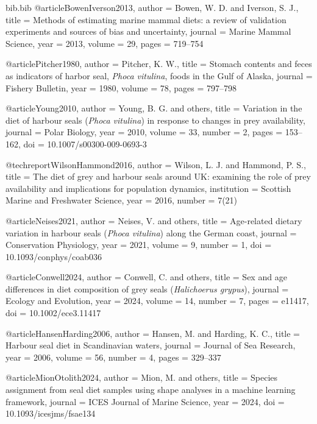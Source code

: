 \begin{filecontents*}{bib.bib}
@article{BowenIverson2013,
  author  = {Bowen, W. D. and Iverson, S. J.},
  title   = {Methods of estimating marine mammal diets: a review of validation experiments and sources of bias and uncertainty},
  journal = {Marine Mammal Science},
  year    = {2013},
  volume  = {29},
  pages   = {719--754}
}

@article{Pitcher1980,
  author  = {Pitcher, K. W.},
  title   = {Stomach contents and feces as indicators of harbor seal, \textit{Phoca vitulina}, foods in the {G}ulf of {A}laska},
  journal = {Fishery Bulletin},
  year    = {1980},
  volume  = {78},
  pages   = {797--798}
}

@article{Young2010,
  author  = {Young, B. G. and others},
  title   = {Variation in the diet of harbour seals (\textit{Phoca vitulina}) in response to changes in prey availability},
  journal = {Polar Biology},
  year    = {2010},
  volume  = {33},
  number  = {2},
  pages   = {153--162},
  doi     = {10.1007/s00300-009-0693-3}
}

@techreport{WilsonHammond2016,
  author      = {Wilson, L. J. and Hammond, P. S.},
  title       = {The diet of grey and harbour seals around {UK}: examining the role of prey availability and implications for population dynamics},
  institution = {Scottish Marine and Freshwater Science},
  year        = {2016},
  number      = {7(21)}
}

@article{Neises2021,
  author  = {Neises, V. and others},
  title   = {Age-related dietary variation in harbour seals (\textit{Phoca vitulina}) along the {G}erman coast},
  journal = {Conservation Physiology},
  year    = {2021},
  volume  = {9},
  number  = {1},
  doi     = {10.1093/conphys/coab036}
}

@article{Conwell2024,
  author  = {Conwell, C. and others},
  title   = {Sex and age differences in diet composition of grey seals (\textit{Halichoerus grypus})},
  journal = {Ecology and Evolution},
  year    = {2024},
  volume  = {14},
  number  = {7},
  pages   = {e11417},
  doi     = {10.1002/ece3.11417}
}

@article{HansenHarding2006,
  author  = {Hansen, M. and Harding, K. C.},
  title   = {Harbour seal diet in {S}candinavian waters},
  journal = {Journal of Sea Research},
  year    = {2006},
  volume  = {56},
  number  = {4},
  pages   = {329--337}
}

@article{MionOtolith2024,
  author  = {Mion, M. and others},
  title   = {Species assignment from seal diet samples using shape analyses in a machine learning framework},
  journal = {ICES Journal of Marine Science},
  year    = {2024},
  doi     = {10.1093/icesjms/fsae134}
}


\end{filecontents*}
